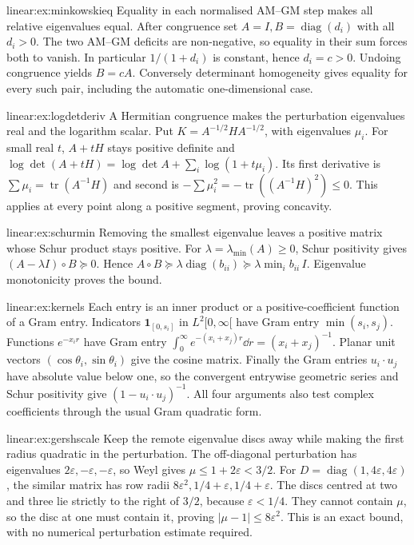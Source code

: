 \begin{solution}{linear:ex:minkowskieq}
\idea Equality in each normalised AM--GM step makes all relative eigenvalues equal.
\writeup After congruence set $A=I,B=\operatorname{diag}(d_i)$ with all $d_i>0$. The two AM--GM deficits are non-negative, so equality in their sum forces both to vanish. In particular $1/(1+d_i)$ is constant, hence $d_i=c>0$. Undoing congruence yields $B=cA$. Conversely determinant homogeneity gives equality for every such pair, including the automatic one-dimensional case.
\end{solution}
\begin{solution}{linear:ex:logdetderiv}
\idea A Hermitian congruence makes the perturbation eigenvalues real and the logarithm scalar.
\writeup Put $K=A^{-1/2}HA^{-1/2}$, with eigenvalues $\mu_i$. For small real $t$, $A+tH$ stays positive definite and $\log\det(A+tH)=\log\det A+\sum_i\log(1+t\mu_i)$. Its first derivative is $\sum\mu_i=\operatorname{tr}(A^{-1}H)$ and second is $-\sum\mu_i^2=-\operatorname{tr}((A^{-1}H)^2)\le0$. This applies at every point along a positive segment, proving concavity.
\end{solution}
\begin{solution}{linear:ex:schurmin}
\idea Removing the smallest eigenvalue leaves a positive matrix whose Schur product stays positive.
\writeup For $\lambda=\lambda_{\min}(A)\ge0$, Schur positivity gives $(A-\lambda I)\circ B\succeq0$. Hence $A\circ B\succeq\lambda\operatorname{diag}(b_{ii})\succeq\lambda\min_ib_{ii}\,I$. Eigenvalue monotonicity proves the bound.
\end{solution}
\begin{solution}{linear:ex:kernels}
\idea Each entry is an inner product or a positive-coefficient function of a Gram entry.
\writeup Indicators $\mathbf1_{[0,s_i]}$ in $L^2[0,\infty[$ have Gram entry $\min(s_i,s_j)$. Functions $e^{-x_ir}$ have Gram entry $\int_0^\infty e^{-(x_i+x_j)r}\dd r=(x_i+x_j)^{-1}$. Planar unit vectors $(\cos\theta_i,\sin\theta_i)$ give the cosine matrix. Finally the Gram entries $u_i\cdot u_j$ have absolute value below one, so the convergent entrywise geometric series and Schur positivity give $(1-u_i\cdot u_j)^{-1}$. All four arguments also test complex coefficients through the usual Gram quadratic form.
\end{solution}
\begin{solution}{linear:ex:gershscale}
\idea Keep the remote eigenvalue discs away while making the first radius quadratic in the perturbation.
\writeup The off-diagonal perturbation has eigenvalues $2\varepsilon,-\varepsilon,-\varepsilon$, so Weyl gives $\mu\le1+2\varepsilon<3/2$. For $D=\operatorname{diag}(1,4\varepsilon,4\varepsilon)$, the similar matrix has row radii $8\varepsilon^2,1/4+\varepsilon,1/4+\varepsilon$. The discs centred at two and three lie strictly to the right of $3/2$, because $\varepsilon<1/4$. They cannot contain $\mu$, so the disc at one must contain it, proving $|\mu-1|\le8\varepsilon^2$. This is an exact bound, with no numerical perturbation estimate required.
\end{solution}
